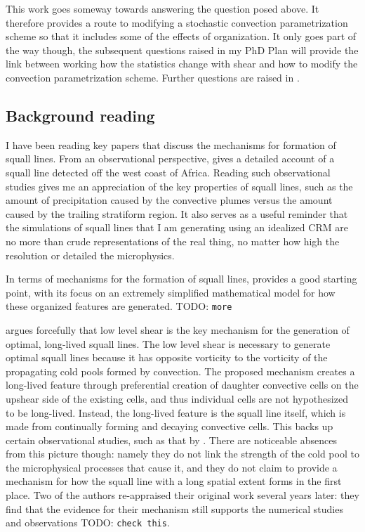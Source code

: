 \documentclass[11pt,a4paper]{article}
\newcommand{\todo}{TODO: \texttt}
\begin{document}
This work goes someway towards answering the question posed above. It therefore provides a route to modifying a stochastic convection parametrization scheme so that it includes some of the effects of organization. It only goes part of the way though, the subsequent questions raised in my PhD Plan will provide the link between working how the statistics change with shear and how to modify the convection parametrization scheme. Further questions are raised in \cite{muetz2017effects}. 

\subsection{Background reading}

I have been reading key papers that discuss the mechanisms for formation of squall lines. From an
observational perspective, \cite{houze1977structure} gives a detailed account of a squall line detected off the west coast of Africa. Reading such observational studies gives me an appreciation of the key properties of squall lines, such as the amount of precipitation caused by the convective plumes versus the amount caused by the trailing stratiform region.  It also serves as a useful reminder that the simulations of squall lines that I am generating using an idealized CRM are no more than crude representations of the real thing, no matter how high the resolution or detailed the microphysics.

In terms of mechanisms for the formation of squall lines, \cite{TMM1982} provides a good starting point, with its focus on an extremely simplified mathematical model for how these organized features are generated. \todo{more}

\cite{RKW1988} argues forcefully that low level shear is the key mechanism for the generation of optimal, long-lived squall lines. The low level shear is necessary to generate optimal squall lines because it has opposite vorticity to the vorticity of the propagating cold pools formed by convection. The proposed mechanism creates a long-lived feature through preferential creation of daughter convective cells on the upshear side of the existing cells, and thus individual cells are not hypothesized to be long-lived. Instead, the long-lived feature is the squall line itself, which is made from continually forming and decaying convective cells. This backs up certain observational studies, such as that by \cite{houze1977structure}. There are noticeable absences from this picture though: namely they do not link the strength of the cold pool to the microphysical processes that cause it, and they do not claim to provide a mechanism for how the squall line with a long spatial extent forms in the first place. Two of the authors re-appraised their original work several years later: they find that the evidence for their mechanism still supports the numerical studies and observations \todo{check this}.
\end{document}
